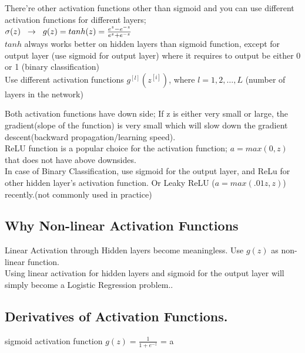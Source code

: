 \documentclass{article}
\begin{document}
There're other activation functions other than sigmoid and you can use different activation functions for different layers; \\
$\sigma(z) \hspace{2mm} \rightarrow\hspace{2mm} g(z) = tanh(z) = \frac{e^{z} - e^{-z}}{e^{z}+e^{-z}}$\\

$tanh$ always works better on hidden layers than sigmoid function, except for output layer (use sigmoid for output layer) where it requires to output be either 0 or 1 (binary classification)\\


Use different activation functions $g^{[l]}(z^{[i]})$, where $l=1,2, \dots, L$ (number of layers in the network)


Both activation functions have down side; If z is either very small or large, the gradient(slope of the function) is very small which will slow down the gradient descent(backward propagation/learning speed).\\

ReLU function is a popular choice for the activation function; $a=max(0,z)$ that does not have above downsides.\\

In case of Binary Classification, use sigmoid for the output layer, and ReLu for other hidden layer's activation function. Or Leaky ReLU ($a=max(.01z, z)$) recently.(not commonly used in practice)\\

\newpage
\subsection{Why Non-linear Activation Functions}

Linear Activation through Hidden layers become meaningless.
Use $g(z)$ as non-linear function.\\
Using linear activation for hidden layers and sigmoid for the output layer will simply become a Logistic Regression problem..\\

\newpage
\subsection{Derivatives of Activation Functions.}

sigmoid activation function $g(z)= \frac{1}{1+e^{-z}}$ = a\\
\end{document}
